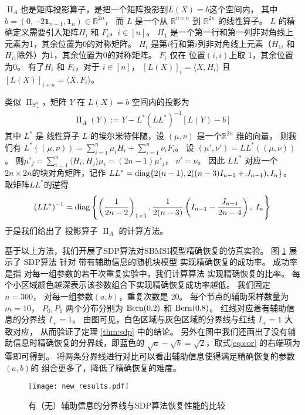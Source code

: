 $\upPi_A$也是矩阵投影算子，是把一个矩阵投影到$L(X) = b$这个空间内，
其中 $b=(0, -2 \mathbf{1}_{n-1}, \mathbf{1}_{n}) \in \mathbb{R}^{2n}$，
而
$L$ 是一个从 $\mathbb{R}^{n \times n} $ 到 $\mathbb{R}^{2n}$ 的线性算子。
$L$ 的精确定义需要引入矩阵$H_i$ 和 $F_i$，$i\in [n]$。
$H_1$ 是一个第一行和第一列非对角线上元素为1，其余位置为0的对称矩阵。
$H_i$ 是第$i$行和第$i$列非对角线上元素（$H_{1i}$ 和 $H_{i1}$除外）为1，其余位置为0的对称矩阵。
$F_i$ 仅在  位置$(i,i)$上取 1，其余位置为0。
有了$H_i$ 和 $F_i$，对于 $i \in [n]$，
$[L(X)]_i = \langle X,H_i \rangle$ 且 $[L(X)]_{i+n} = \langle X,F_i \rangle$。

类似 $\upPi_{S_+^n}$，矩阵 $Y$ 在 $L(X)=b$ 空间内的投影为
\begin{align}\label{eq:proj:L:Y}
\upPi_{A}(Y) := Y - L^* (L L^*)^{-1}[ L(Y) - b] 
\end{align}
其中 $L^*$  是 线性算子 $L$ 的埃尔米特伴随，设 $(\mu,\nu)$ 是一个$\mathbb{R}^{2n}$ 维的向量，
则我们有 $L^*((\mu,\nu)) = \sum_{i=1}^n \mu_i H_i + \sum_{i=1}^n \nu_i F_i$。
设 $(\mu',\nu')=LL^*((\mu,\nu))$。
则$\mu'_j = \sum_{i=1}^n \langle H_i, H_j \rangle \mu_i
=(2n-1)\mu'_j$，
$\nu'=\nu$。
因此 $L L^*$ 对应一个 $2n\times 2n$的块对角矩阵，记作
$LL^*=\operatorname{diag}\{2(n-1), 2((n-3)I_{n-1}+J_{n-1}),I_n\} $。
取矩阵$L L^*$的逆得
\begin{align*}
(LL^*)^{-1} = \operatorname{diag}\left\{ \left(\frac{1}{2n-2}\right)_{1\times 1},\frac{1}{2(n-3)} 
\left( I_{n-1} - \frac{J_{n-1}}{2n-4} \right),\; I_n \right\}
\end{align*}
于是我们给出了 投影算子 $\upPi_{A} $ 
的计算方法。

基于以上方法，我们开展了SDP算法对SBMSI模型精确恢复的仿真实验。
图 \ref{fig:my_label} 展示了 SDP算法
针对 带有辅助信息的随机块模型 实现精确恢复的成功率。
成功率是指 对每一组参数的若干次重复实验中，我们计算算法
实现精确恢复的比率。
每个小区域颜色越深表示该参数组合下实现精确恢复成功率越低。
我们固定 $n=300$， 对每一组参数$(a,b)$，重复次数是 20。
每个节点的辅助采样数量为 $m=10$，
$P_0,P_1$ 两个分布分别为 $\operatorname{Bern}(0.2)$ 和 $\operatorname{Bern}(0.8)$。
红线对应着有辅助信息的分界线 $I_+ = 1$。
由图可见，白色区域与灰色区域的分界线与红线 $I_+ = 1$ 大致对应，
从而验证了定理 \ref{thm:sdp} 中的结论。
另外在图中我们还画出了没有辅助信息时精确恢复的分界线，即蓝色的 
$\sqrt{a}-\sqrt{b}=\sqrt{2}$，取式\eqref{eq:cor}
的右端项为零即可得到。
将两条分界线进行对比可以看出辅助信息使得满足精确恢复的参数$(a,b)$的
组合更多了，降低了精确恢复的难度。

\begin{figure}[!ht]
    \centering
    \texttt{[image: new\_results.pdf]}
    \caption{有（无）辅助信息的分界线与SDP算法恢复性能的比较}
    \label{fig:my_label}
\end{figure}


